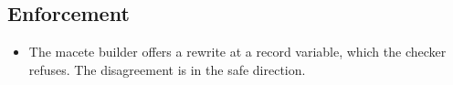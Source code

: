 \subsection{Enforcement}

\begin{itemize}
\item The macete builder offers a rewrite at a record variable, which the
  checker refuses.  The disagreement is in the safe direction.
\end{itemize}

